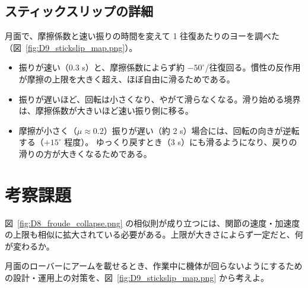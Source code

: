 \subsection{スティックスリップの詳細}


月面で、摩擦係数と速い振りの時間を変えて 1 往復あたりのヨーを調べた（図~\ref{fig:D9_stickslip_map.png}）。
\begin{itemize}
\item 振りが速い（0.3 s）と、摩擦係数によらず約 $-50^\circ$/往復回る。慣性の反作用が摩擦の上限を大きく超え、ほぼ自由に滑るためである。
\item 振りが遅いほど、回転は小さくなり、やがて滑らなくなる。滑り始める境界は、摩擦係数が大きいほど速い振り側に移る。
\item 摩擦が小さく（$\mu\approx0.2$）振りが遅い（約 2 s）場合には、回転の向きが逆転する（$+15^\circ$ 程度）。
  ゆっくり戻すとき（3 s）にも滑るようになり、戻りの滑りの方が大きくなるためである。
\end{itemize}


\section*{考察課題}
\begin{exercise}
図~\ref{fig:D8_froude_collapse.png} の相似則が成り立つには、関節の速度・加速度の上限も相似に拡大されている必要がある。上限が大きさによらず一定だと、何が変わるか。
\end{exercise}
\begin{exercise}
月面のローバーにアームを載せるとき、作業中に機体が回らないようにするための設計・運用上の対策を、図~\ref{fig:D9_stickslip_map.png} から考えよ。
\end{exercise}
